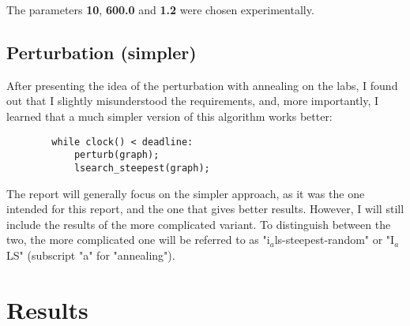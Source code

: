 \documentclass[14pt]{article}
\begin{document}
The parameters \textbf{10}, \textbf{600.0} and \textbf{1.2} were chosen
experimentally.

\subsection{Perturbation (simpler)}
After presenting the idea of the perturbation with annealing on the labs, I
found out that I slightly misunderstood the requirements, and, more
importantly, I learned that a much simpler version of this algorithm works
better:
\begin{listing}[H]
	\begin{verbatim}
		while clock() < deadline:
			perturb(graph);
			lsearch_steepest(graph);
	\end{verbatim}
\end{listing}
\vspace{-1cm}
\noindent
The report will generally focus on the simpler approach, as it was the one
intended for this report, and the one that gives better results. However, I
will still include the results of the more complicated variant. To distinguish
between the two, the more complicated one will be referred to as
"i$_a$ls-steepest-random" or "I$_a$LS" (subscript "a" for "annealing").

\section{Results}
\end{document}
